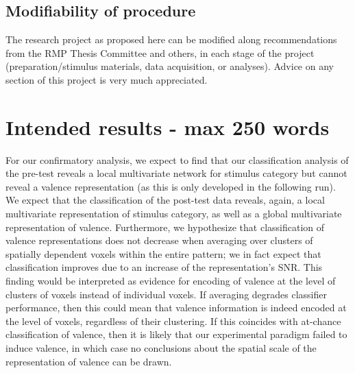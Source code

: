 \documentclass[12pt,a4paper]{article}\usepackage[]{graphicx}\usepackage[]{color}
\begin{document}
\subsection{Modifiability of procedure}
The research project as proposed here can be modified along recommendations from the RMP Thesis Committee and others, in each stage of the project (preparation/stimulus materials, data acquisition, or analyses). Advice on any section of this project is very much appreciated. \\

\noindent
\wordcount

\section{Intended results \textmd{- max 250 words}}

For our confirmatory analysis, we expect to find that our classification analysis of the pre-test reveals a local multivariate network for stimulus category but cannot reveal a valence representation (as this is only developed in the following run). We expect that the classification of the post-test data reveals, again, a local multivariate representation of stimulus category, as well as a global multivariate representation of valence. Furthermore, we hypothesize that classification of valence representations does not decrease when averaging over clusters of spatially dependent voxels within the entire pattern; we in fact expect that classification improves due to an increase of the representation's SNR. This finding would be interpreted as evidence for encoding of valence at the level of clusters of voxels instead of individual voxels. If averaging degrades classifier performance, then this could mean that valence information is indeed encoded at the level of voxels, regardless of their clustering. If this coincides with at-chance classification of valence, then it is likely that our experimental paradigm failed to induce valence, in which case no conclusions about the spatial scale of the representation of valence can be drawn.
\end{document}
